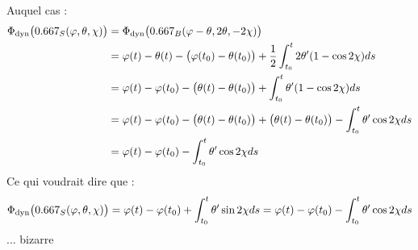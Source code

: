 Auquel cas :
\begin{align*}
	\phased\big(\x_S(\varphi, \theta, \chi) \big) &= \phased\big(\x_B(\varphi-\theta, 2\theta, -2\chi) \big) \\
	&= \varphi(t) - \theta(t) - \big( \varphi(t_0) - \theta(t_0) \big) + \frac{1}{2} \int_{t_0}^t 2\theta' (1 - \cos2\chi)ds \\
	&= \varphi(t) - \varphi(t_0) - \big( \theta(t) - \theta(t_0) \big) + \int_{t_0}^t \theta' (1 - \cos2\chi)ds \\
	&= \varphi(t) - \varphi(t_0) - \big( \theta(t) - \theta(t_0) \big) + \big( \theta(t) - \theta(t_0) \big) - \int_{t_0}^t \theta' \cos2\chi ds \\
	&= \varphi(t) - \varphi(t_0) - \int_{t_0}^t \theta' \cos2\chi ds
\end{align*}
Ce qui voudrait dire que :
\[\phased\big(\x_S(\varphi, \theta, \chi) \big) = \varphi(t) - \varphi(t_0) + \int_{t_0}^t \theta' \sin2\chi ds = \varphi(t) - \varphi(t_0) - \int_{t_0}^t \theta' \cos2\chi ds\]
... bizarre